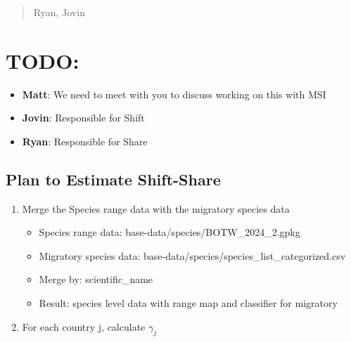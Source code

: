 \documentclass[
  letterpaper,
]{article}
\providecommand{\tightlist}{%
  \setlength{\itemsep}{0pt}\setlength{\parskip}{0pt}}\usepackage{longtable,booktabs,array}
\begin{document}
\begin{tcolorbox}[enhanced jigsaw, leftrule=.75mm, opacitybacktitle=0.6, colbacktitle=quarto-callout-note-color!10!white, arc=.35mm, colframe=quarto-callout-note-color-frame, bottomtitle=1mm, coltitle=black, left=2mm, toptitle=1mm, opacityback=0, colback=white, breakable, bottomrule=.15mm, toprule=.15mm, title=\textcolor{quarto-callout-note-color}{\faInfo}\hspace{0.5em}{8/27/2025}, rightrule=.15mm, titlerule=0mm]

\begin{quote}
Ryan, Jovin
\end{quote}

\section{TODO:}\label{todo-1}

\begin{itemize}
\tightlist
\item
  \textbf{Matt}: We need to meet with you to discuss working on this
  with MSI
\item
  \textbf{Jovin}: Responsible for Shift
\item
  \textbf{Ryan}: Responsible for Share
\end{itemize}

\subsection{Plan to Estimate
Shift-Share}\label{plan-to-estimate-shift-share}

\begin{enumerate}
\def\labelenumi{\arabic{enumi}.}
\tightlist
\item
  Merge the Species range data with the migratory species data

  \begin{itemize}
  \tightlist
  \item
    Species range data: base-data/species/BOTW\_2024\_2.gpkg
  \item
    Migratory species data:
    base-data/species/species\_list\_categorized.csv
  \item
    Merge by: scientific\_name
  \item
    Result: species level data with range map and classifier for
    migratory
  \end{itemize}
\item
  For each country j, calculate \(\gamma_j\)
\end{enumerate}


\end{tcolorbox}
\end{document}
